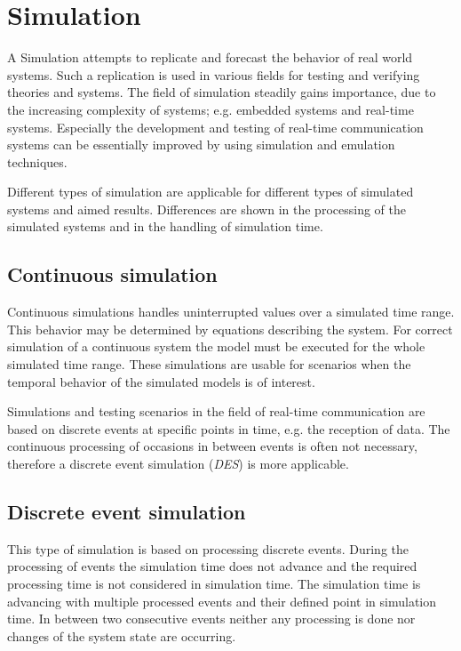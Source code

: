 \chapter{Simulation}
\label{cha:simulation}

A Simulation attempts to replicate and forecast the behavior of real world systems.
Such a replication is used in various fields for testing and verifying theories and systems.
The field of simulation steadily gains importance, due to the increasing complexity of systems; e.g. embedded systems and real-time systems.
Especially the development and testing of real-time communication systems can be essentially improved by using simulation and emulation techniques.

Different types of simulation are applicable for different types of simulated systems and aimed results.
Differences are shown in the processing of the simulated systems and in the handling of simulation time.
\cite[section 1.2]{mchaney2009understanding}

\section{Continuous simulation}
\label{sec:simulation_cont}
Continuous simulations handles uninterrupted values over a simulated time range.
This behavior may be determined by equations describing the system.
For correct simulation of a continuous system the model must be executed for the whole simulated time range.
These simulations are usable for scenarios when the temporal behavior of the simulated models is of interest. \cite[section 1.2.1]{mchaney2009understanding}

Simulations and testing scenarios in the field of real-time communication are based on discrete events at specific points in time, e.g. the reception of data.
The continuous processing of occasions in between events is often not necessary, therefore a discrete event simulation (\emph{DES}) is more applicable.

\section{Discrete event simulation}
\label{sec:simulation_event}
This type of simulation is based on processing discrete events.
During the processing of events the simulation time does not advance and the required processing time is not considered in simulation time.
The simulation time is advancing with multiple processed events and their defined point in simulation time.
In between two consecutive events neither any processing is done nor changes of the system state are occurring. \cite[chapter 1]{matloff_introduction_2008}


